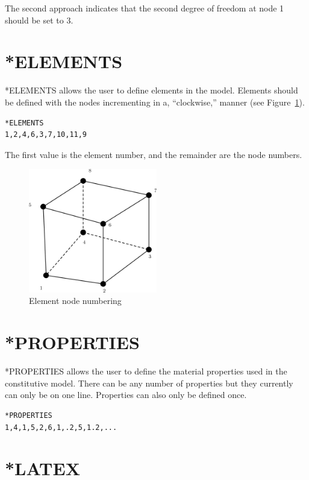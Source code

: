 \documentclass{asme2ej}
\begin{document}
The second approach indicates that the second degree of freedom at node 1 should be set to 3.

\section{*ELEMENTS}

*ELEMENTS allows the user to define elements in the model. Elements should be defined with the nodes incrementing in a, ``clockwise,'' manner (see Figure~\ref{fig:node_numbering}).

\begin{verbatim}
*ELEMENTS
1,2,4,6,3,7,10,11,9
\end{verbatim}

The first value is the element number, and the remainder are the node numbers.

\begin{figure}
\centering
\includegraphics[width=0.5\textwidth]{./element.png}
\caption{Element node numbering}
\label{fig:node_numbering}
\end{figure}

\section{*PROPERTIES}

*PROPERTIES allows the user to define the material properties used in the constitutive model. There can be any number of properties but they currently can only be on one line. Properties can also only be defined once.

\begin{verbatim}
*PROPERTIES
1,4,1,5,2,6,1,.2,5,1.2,...
\end{verbatim}

\section{*LATEX}
\end{document}
